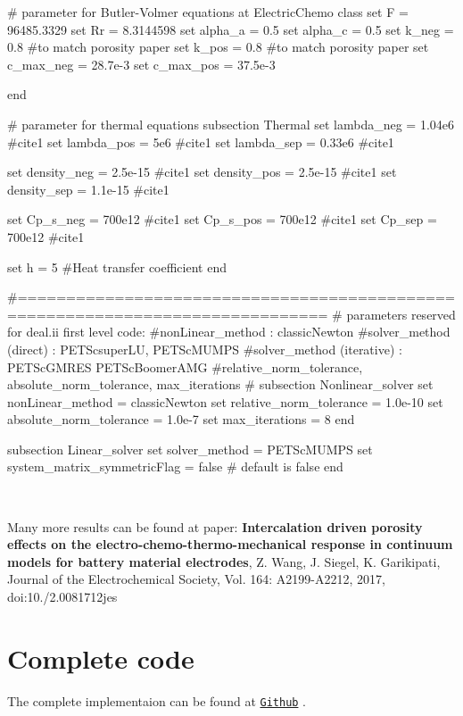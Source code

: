 \begin{DoxyCode}
# parameter \textcolor{keywordflow}{for} Butler-Volmer equations at ElectricChemo \textcolor{keyword}{class}
\textcolor{keyword}{set} F = 96485.3329
set Rr = 8.3144598
set alpha\_a = 0.5
set alpha\_c = 0.5
set k\_neg = 0.8 #to match porosity paper
\textcolor{keyword}{set} k\_pos = 0.8 #to match porosity paper
\textcolor{keyword}{set} c\_max\_neg = 28.7e-3
\textcolor{keyword}{set} c\_max\_pos = 37.5e-3

end

\textcolor{preprocessor}{# parameter for thermal equations}
subsection Thermal
\textcolor{keyword}{set} lambda\_neg = 1.04e6 #cite1
\textcolor{keyword}{set} lambda\_pos = 5e6  #cite1
\textcolor{keyword}{set} lambda\_sep = 0.33e6  #cite1


\textcolor{keyword}{set} density\_neg = 2.5e-15  #cite1
\textcolor{keyword}{set} density\_pos = 2.5e-15  #cite1
\textcolor{keyword}{set} density\_sep = 1.1e-15  #cite1


\textcolor{keyword}{set} Cp\_s\_neg = 700e12  #cite1
\textcolor{keyword}{set} Cp\_s\_pos = 700e12 #cite1
\textcolor{keyword}{set} Cp\_sep = 700e12  #cite1


\textcolor{keyword}{set} h = 5 #Heat transfer coefficient
end
            
                    
\textcolor{preprocessor}{#==============================================================================}
\textcolor{preprocessor}{# parameters reserved for deal.ii first level code:}
\textcolor{preprocessor}{#nonLinear\_method : classicNewton}
\textcolor{preprocessor}{#solver\_method (direct) : PETScsuperLU, PETScMUMPS}
\textcolor{preprocessor}{#solver\_method (iterative) : PETScGMRES PETScBoomerAMG}
\textcolor{preprocessor}{#relative\_norm\_tolerance, absolute\_norm\_tolerance, max\_iterations}
\textcolor{preprocessor}{#}
subsection Nonlinear\_solver
        \textcolor{keyword}{set} nonLinear\_method = classicNewton
        \textcolor{keyword}{set} relative\_norm\_tolerance = 1.0e-10
        \textcolor{keyword}{set} absolute\_norm\_tolerance = 1.0e-7
        \textcolor{keyword}{set} max\_iterations = 8
end
                        
subsection Linear\_solver
        \textcolor{keyword}{set} solver\_method = PETScMUMPS
        \textcolor{keyword}{set} system\_matrix\_symmetricFlag = \textcolor{keyword}{false} # \textcolor{keywordflow}{default} is \textcolor{keyword}{false}
end
\end{DoxyCode}


   ~\newline
 

Many more results can be found at paper\+: {\bfseries Intercalation driven porosity effects on the electro-\/chemo-\/thermo-\/mechanical response in continuum models for battery material electrodes}, Z. Wang, J. Siegel, K. Garikipati, Journal of the Electrochemical Society, Vol. 164\+: A2199-\/\+A2212, 2017, doi\+:10./2.0081712jes \hypertarget{_intercalation_com}{}\section{Complete code}\label{_intercalation_com}
The complete implementaion can be found at \href{https://github.com/mechanoChem/batteryCode/tree/homogenizedModel}{\tt Github} . 